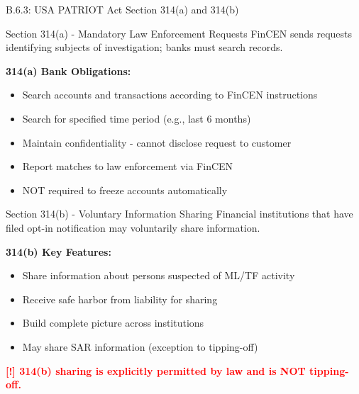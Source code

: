 \documentclass[11pt,a4paper]{beamer}
\newcommand{\redflag}[1]{\textcolor{red}{\textbf{[!] #1}}}
\begin{document}
	\begin{frame}{B.6.3: USA PATRIOT Act Section 314(a) and 314(b)}
		\begin{block}{Section 314(a) - Mandatory Law Enforcement Requests}
			FinCEN sends requests identifying subjects of investigation; banks must search records.
		\end{block}
		\textbf{314(a) Bank Obligations:}
		\begin{itemize}
			\item Search accounts and transactions according to FinCEN instructions
			\item Search for specified time period (e.g., last 6 months)
			\item Maintain confidentiality - cannot disclose request to customer
			\item Report matches to law enforcement via FinCEN
			\item NOT required to freeze accounts automatically
		\end{itemize}
		\begin{block}{Section 314(b) - Voluntary Information Sharing}
			Financial institutions that have filed opt-in notification may voluntarily share information.
		\end{block}
		\textbf{314(b) Key Features:}
		\begin{itemize}
			\item Share information about persons suspected of ML/TF activity
			\item Receive safe harbor from liability for sharing
			\item Build complete picture across institutions
			\item May share SAR information (exception to tipping-off)
		\end{itemize}
		\redflag{314(b) sharing is explicitly permitted by law and is NOT tipping-off.}
	\end{frame}
	
\end{document}
